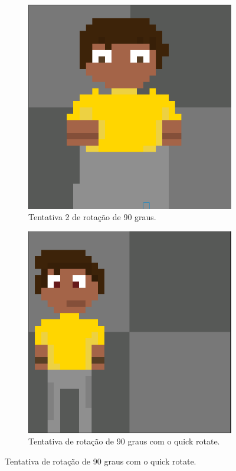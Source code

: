 \begin{figure}[htbp]
\begin{subfigure}{0.35\linewidth}
        \includegraphics[width=1\linewidth]{figs/pixelLab/dia1/resultado rotacao 2.PNG}
        \caption{\small Tentativa 2 de rotação de 90 graus.}
        \label{fig:pixelLabRot1c}
    \end{subfigure}
    \begin{subfigure}{0.35\linewidth}
        \includegraphics[width=1\linewidth]{figs/pixelLab/dia1/rotacao 90 graus.PNG}
        \caption{\small Tentativa de rotação de 90 graus com o quick rotate.}
        \label{fig:pixelLabRot1d}
    \end{subfigure}

    
\end{figure}


